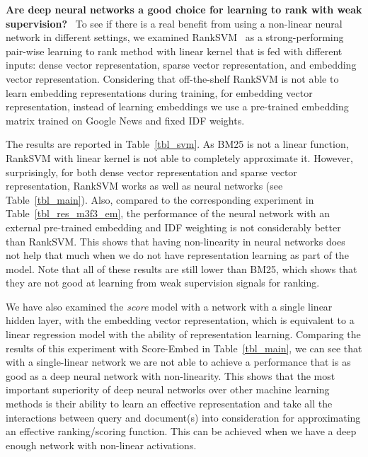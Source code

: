 \documentclass[sigconf]{acmart}
\newcommand{\modelone}{\textit{score} model\xspace}
\newcommand{\mone}{Score\xspace}
\newcommand{\feedone}{dense vector representation\xspace}
\newcommand{\feedtwo}{sparse vector representation\xspace}
\newcommand{\feedthree}{embedding vector representation\xspace}
\newcommand{\fthree}{Embed\xspace}
\def\:{\hskip0pt} %
\newcommand{\mypar}[1]{\vspace*{-0.1ex}\medskip\noindent\textbf{#1}~}
\begin{document}


\mypar{Are deep neural networks a good choice for learning to rank with weak supervision?}
%
To see if there is a real benefit from using a non-linear neural network in different settings, we examined RankSVM~\citep{Joachims:2002} as a strong-performing pair-wise learning to rank method with linear kernel that is fed with different inputs: \feedone, \feedtwo, and \feedthree. Considering that off-the-shelf RankSVM is not able to learn embedding representations during training, for \feedthree, instead of learning embeddings we use a pre-trained embedding matrix trained on Google News and fixed IDF weights. 

The results are reported in Table~\ref{tbl_svm}. As BM25 is not a linear function, RankSVM with linear kernel is not able to completely approximate it. However, surprisingly, for both \feedone and \feedtwo, RankSVM works as well as neural networks (see Table~\ref{tbl_main}). 
%
Also, compared to the corresponding experiment in Table~\ref{tbl_res_m3f3_em}, the performance of the neural network with an external pre-trained embedding and IDF weighting is not considerably better than RankSVM. 
This shows that having non-linearity in neural networks does not help that much when we do not have representation learning as part of the model.
%
Note that all of these results are still lower than BM25, which shows that they are not good at learning from weak supervision signals for ranking. 
%

We have also examined the \modelone with a network with a single linear hidden layer, with the \feedthree, which is equivalent to a linear regression model with the ability of representation learning. 
Comparing the results of this experiment with \mone-\fthree in Table~\ref{tbl_main}, we can see that with a single-linear network we are not able to achieve a performance that is as good as a deep neural network with non-linearity.
%
This shows that the most important superiority of deep neural networks over other machine learning methods is their ability to learn an effective representation and take all the interactions between query and document(s) into consideration for approximating an effective ranking/scoring function. 
This can be achieved when we have a deep enough network with non-\:linear activations.
\end{document}
